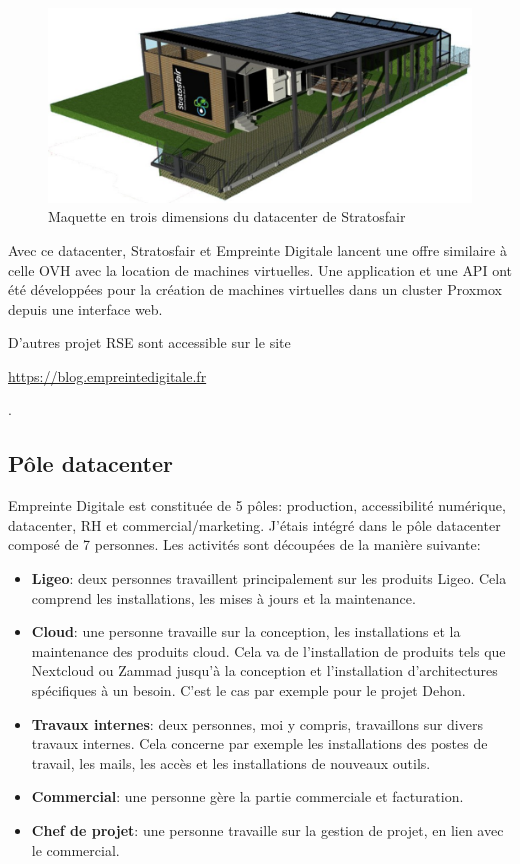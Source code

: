\documentclass[12pt, a4paper, twoside]{article}
\begin{document}
\begin{figure}[!ht]
    \centering
    \includegraphics[width=\textwidth]{src/scheme_strato.jpg}
    \caption{Maquette en trois dimensions du datacenter de Stratosfair}
    \label{fig:strato}
\end{figure}

Avec ce datacenter, Stratosfair et Empreinte Digitale lancent une offre similaire à celle OVH avec la location de machines virtuelles.
Une application et une \gls{API} ont été développées pour la création de machines virtuelles dans un \gls{cluster} \gls{Proxmox} depuis une interface web.

D'autres projet \gls{RSE} sont accessible sur le site \begin{hilite}\url{https://blog.empreintedigitale.fr}\end{hilite}.

\subsection{Pôle datacenter}
Empreinte Digitale est constituée de 5 pôles: production, accessibilité numérique, datacenter, RH et commercial/marketing.
J'étais intégré dans le pôle datacenter composé de 7 personnes. 
\noindent%
Les activités sont découpées de la manière suivante:
\begin{itemize}
    \item \textbf{Ligeo}: deux personnes travaillent principalement sur les produits Ligeo. 
    Cela comprend les installations, les mises à jours et la maintenance.
    \item \textbf{Cloud}: une personne travaille sur la conception, les installations et la maintenance des produits cloud. 
    Cela va de l'installation de produits tels que \gls{Nextcloud} ou \gls{Zammad} jusqu'à la conception et l'installation d'architectures spécifiques à un besoin. 
    C'est le cas par exemple pour le projet Dehon.
    \item \textbf{Travaux internes}: deux personnes, moi y compris, travaillons sur divers travaux internes. 
    Cela concerne par exemple les installations des postes de travail, les mails, les accès et les installations de nouveaux outils.
    \item \textbf{Commercial}: une personne gère la partie commerciale et facturation.
    \item \textbf{Chef de projet}: une personne travaille sur la gestion de projet, en lien avec le commercial.
\end{itemize}
\end{document}
